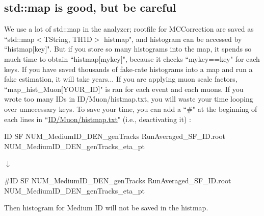 \documentclass[12pt, a4paper, titlepage]{article}
\begin{document}
\subsection{std::map is good, but be careful}

We use a lot of std::map in the analyzer; rootfile for MCCorrection are saved as ``std::map$<$TString, TH1D$>$ histmap",
and histogram can be accessed by ``histmap$[$key$]$".
But if you store so many histograms into the map, it spends so much time to obtain ``histmap$[$mykey$]$",
because it checks ``mykey==key" for each keys.
If you have saved thousands of fake-rate histograms into a map and run a fake estimation, it will take years...
If you are applying muon scale factors,
``map\_hist\_Muon$[$YOUR\_ID$]$" is ran for each event and each muons.
If you wrote too many IDs in ID/Muon/histmap.txt, you will waste your time looping over unnecessary keys.
To save your time, you can add a ``\#" at the beginning of each lines in ``\href{https://github.com/CMSSNU/SKFlatAnalyzer/blob/Run2Legacy\_v1\_\_190123/data/Run2Legacy\_v1/2016/ID/Muon/histmap.txt}{ID/Muon/histmap.txt}" (i.e., deactivating it) : \\
\centerline{ID SF NUM\_MediumID\_DEN\_genTracks RunAveraged\_SF\_ID.root NUM\_MediumID\_DEN\_genTracks\_eta\_pt}
\centerline{$\downarrow$}
\centerline{\#ID SF NUM\_MediumID\_DEN\_genTracks RunAveraged\_SF\_ID.root NUM\_MediumID\_DEN\_genTracks\_eta\_pt}
Then histogram for Medium ID will not be saved in the histmap.
\end{document}
